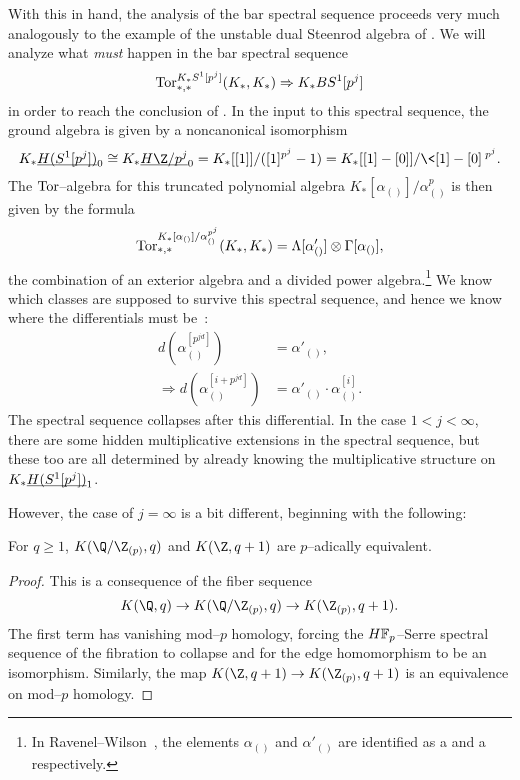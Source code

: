With this in hand, the analysis of the bar spectral sequence proceeds very much analogously to the example of the unstable dual Steenrod algebra of .  We will analyze what \emph{must} happen in the bar spectral sequence \[\operatorname{Tor}^{K_* S^1[p^j]}_{*, *}(K_*, K_*) \Rightarrow K_* BS^1[p^j]\] in order to reach the conclusion of .  In the input to this spectral sequence, the ground algebra is given by a noncanonical isomorphism \[K_* \OS{H(S^1[p^j])}{0} \cong K_* \OS{H\Z/p^j}{0} = K_*[[1]] / ([1]^{p^j} - 1) = K_*[[1] - [0]] / \<[1] - [0]\>^{p^j}.\]  The \(\operatorname{Tor}\)--algebra for this truncated polynomial algebra \(K_*[\alpha_{()}] / \alpha_{()}^{p}\) is then given by the formula \[\operatorname{Tor}^{K_*[\alpha_{()}] / \alpha_{()}^{p^j}}_{*, *}(K_*, K_*) = \Lambda[\alpha'_{()}] \otimes \Gamma[\alpha_{()}],\] the combination of an exterior algebra and a divided power algebra.\footnote{In Ravenel--Wilson~\cite[Lemma 6.6]{RavenelWilsonKthyOfEMSpaces}, the elements \(\alpha_{()}\) and \(\alpha'_{()}\) are identified as a  and a  respectively.}  We know which classes are supposed to survive this spectral sequence, and hence we know where the differentials must be~\cite[Section 8]{RavenelWilsonKthyOfEMSpaces}:
\begin{align*}
d\left(\alpha_{()}^{[p^{jd}]}\right) & = \alpha'_{()}, \\
\Rightarrow d\left(\alpha_{()}^{[i + p^{jd}]}\right) & = \alpha'_{()} \cdot \alpha_{()}^{[i]}.
\end{align*}
The spectral sequence collapses after this differential.  In the case \(1 < j < \infty\), there are some hidden multiplicative extensions in the spectral sequence, but these too are all determined by already knowing the multiplicative structure on \(K_* \OS{H(S^1[p^j])}{1}\).

However, the case of \(j = \infty\) is a bit different, beginning with the following:

\begin{lemma}
For \(q \ge 1\), \(K(\Q/\Z_{(p)}, q)\) and \(K(\Z, q+1)\) are \(p\)--adically equivalent.
\end{lemma}
\begin{proof}
This is a consequence of the fiber sequence \[K(\Q, q) \to K(\Q/\Z_{(p)}, q) \to K(\Z_{(p)}, q+1).\]  The first term has vanishing mod--\(p\) homology, forcing the \(\HFp\)--Serre spectral sequence of the fibration to collapse and for the edge homomorphism to be an isomorphism.  Similarly, the map \(K(\Z, q+1) \to K(\Z_{(p)}, q+1)\) is an equivalence on mod--\(p\) homology.
\end{proof}


